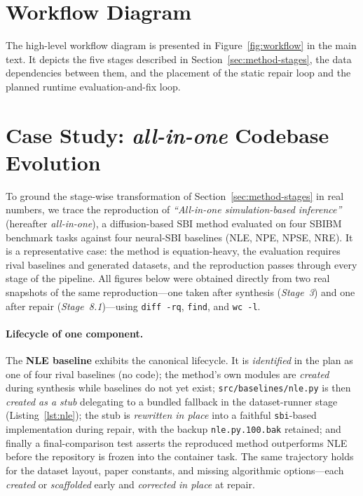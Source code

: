 \documentclass[11pt]{article}
\begin{document}


\appendix

\section{Workflow Diagram}
\label{sec:appendix-workflow}

The high-level workflow diagram is presented in
Figure~\ref{fig:workflow} in the main text. It depicts the
five stages described in Section~\ref{sec:method-stages}, the
data dependencies between them, and the placement of the static
repair loop and the planned runtime evaluation-and-fix loop.

\section{Case Study: \emph{all-in-one} Codebase Evolution}
\label{sec:appendix-casestudy}

To ground the stage-wise transformation of Section~\ref{sec:method-stages}
in real numbers, we trace the reproduction of \emph{``All-in-one
simulation-based inference''} (hereafter \emph{all-in-one}), a
diffusion-based SBI method evaluated on four SBIBM benchmark tasks
against four neural-SBI baselines (NLE, NPE, NPSE, NRE). It is a
representative case: the method is equation-heavy, the evaluation
requires rival baselines and generated datasets, and the
reproduction passes through every stage of the pipeline. All
figures below were obtained directly from two real snapshots of the
same reproduction---one taken after synthesis (\emph{Stage~3}) and
one after repair (\emph{Stage~8.1})---using \texttt{diff -rq},
\texttt{find}, and \texttt{wc -l}.

\paragraph{Lifecycle of one component.} The \textbf{NLE baseline}
exhibits the canonical lifecycle. It is \emph{identified} in the
plan as one of four rival baselines (no code); the method's own
modules are \emph{created} during synthesis while baselines do not
yet exist; \texttt{src/baselines/nle.py} is then \emph{created as a
stub} delegating to a bundled fallback in the dataset-runner stage
(Listing~\ref{lst:nle}); the stub is \emph{rewritten in place} into
a faithful \texttt{sbi}-based implementation during repair, with the
backup \texttt{nle.py.100.bak} retained; and finally a
final-comparison test asserts the reproduced method outperforms NLE
before the repository is frozen into the container task. The same
trajectory holds for the dataset layout, paper constants, and
missing algorithmic options---each \emph{created} or \emph{scaffolded}
early and \emph{corrected in place} at repair.
\end{document}
